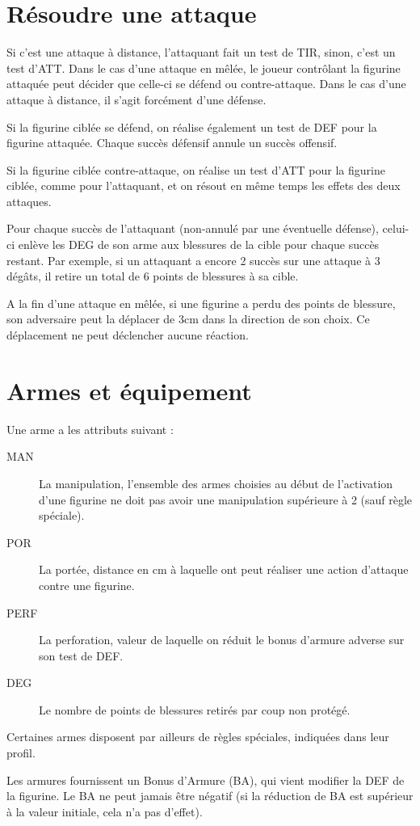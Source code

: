 \documentclass[10pt,a4paper]{article}
\begin{document}
\begin{multicols}{3}
\section*{Résoudre une attaque}
Si c'est une attaque à distance, l'attaquant fait un test de TIR, sinon, c'est un test d'ATT. Dans le cas d'une attaque en mêlée, le joueur contrôlant la figurine attaquée peut décider que celle-ci se défend ou contre-attaque. Dans le cas d'une attaque à distance, il s'agit forcément d'une défense.

Si la figurine ciblée se défend, on réalise également un test de DEF pour la figurine attaquée. Chaque succès défensif annule un succès offensif. 

Si la figurine ciblée contre-attaque, on réalise un test d'ATT pour la figurine ciblée, comme pour l'attaquant, et on résout en même temps les effets des deux attaques.

Pour chaque succès de l'attaquant (non-annulé par une éventuelle défense), celui-ci enlève les DEG de son arme aux blessures de la cible pour chaque succès restant. Par exemple, si un attaquant a encore 2 succès sur une attaque à 3 dégâts, il retire un total de 6 points de blessures à sa cible.

A la fin d'une attaque en mêlée, si une figurine a perdu des points de blessure, son adversaire peut la déplacer de 3cm dans la direction de son choix. Ce déplacement ne peut déclencher aucune réaction.
\section*{Armes et équipement}
Une arme a les attributs suivant :
\begin{description}
\item[MAN] La manipulation, l'ensemble des armes choisies au début de l'activation d'une figurine ne doit pas avoir une manipulation supérieure à 2 (sauf règle spéciale).
\item[POR]La portée, distance en cm à laquelle ont peut réaliser une action d'attaque contre une figurine.
\item[PERF]La perforation, valeur de laquelle on réduit le bonus d'armure adverse sur son test de DEF.
\item[DEG]Le nombre de points de blessures retirés par coup non protégé.
\end{description}
Certaines armes disposent par ailleurs de règles spéciales, indiquées dans leur profil.

Les armures fournissent un Bonus d'Armure (BA), qui vient modifier la DEF de la figurine. Le BA ne peut jamais être négatif (si la réduction de BA est supérieur à la valeur initiale, cela n'a pas d'effet).

\end{multicols}
\end{document}
